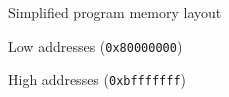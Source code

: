 \documentclass[]{beamer}
\newenvironment{changemargin}[2]{%
  \begin{list}{}{%
      \setlength{\topsep}{0pt}%
      \setlength{\leftmargin}{#1}%
      \setlength{\rightmargin}{#2}%
      \setlength{\listparindent}{\parindent}%
      \setlength{\itemindent}{\parindent}%
      \setlength{\parsep}{\parskip}%
    }%
  \item[]}{\end{list}}
\begin{document}


\begin{frame}[fragile]{Simplified program memory layout}    
 \begin{center}
    {\footnotesize Low addresses ({\tt 0x80000000})}

    
    {\footnotesize High addresses ({\tt 0xbfffffff})}
    
\end{center}
\end{frame}
\end{document}
